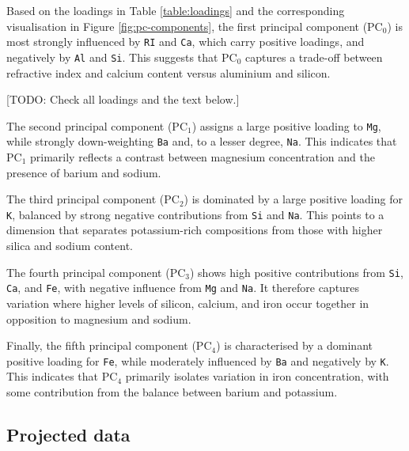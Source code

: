 \documentclass[dtu]{dtuarticle}
\newcommand{\todo}[1]{\color{red}[TODO: #1]\color{black}}
\begin{document}
	Based on the loadings in Table \ref{table:loadings} and the corresponding visualisation in Figure \ref{fig:pc-components}, the first principal component ($\text{PC}_0$) is most strongly influenced by \texttt{RI} and \texttt{Ca}, which carry positive loadings, and negatively by \texttt{Al} and \texttt{Si}. This suggests that $\text{PC}_0$ captures a trade-off between refractive index and calcium content versus aluminium and silicon.


	\todo{Check all loadings and the text below.}

	The second principal component ($\text{PC}_1$) assigns a large positive loading to \texttt{Mg}, while strongly down-weighting \texttt{Ba} and, to a lesser degree, \texttt{Na}. This indicates that $\text{PC}_1$ primarily reflects a contrast between magnesium concentration and the presence of barium and sodium.

	The third principal component ($\text{PC}_2$) is dominated by a large positive loading for \texttt{K}, balanced by strong negative contributions from \texttt{Si} and \texttt{Na}. This points to a dimension that separates potassium-rich compositions from those with higher silica and sodium content.

	The fourth principal component ($\text{PC}_3$) shows high positive contributions from \texttt{Si}, \texttt{Ca}, and \texttt{Fe}, with negative influence from \texttt{Mg} and \texttt{Na}. It therefore captures variation where higher levels of silicon, calcium, and iron occur together in opposition to magnesium and sodium.

	Finally, the fifth principal component ($\text{PC}_4$) is characterised by a dominant positive loading for \texttt{Fe}, while moderately influenced by \texttt{Ba} and negatively by \texttt{K}. This indicates that $\text{PC}_4$ primarily isolates variation in iron concentration, with some contribution from the balance between barium and potassium.

	\subsection{Projected data}
\end{document}
